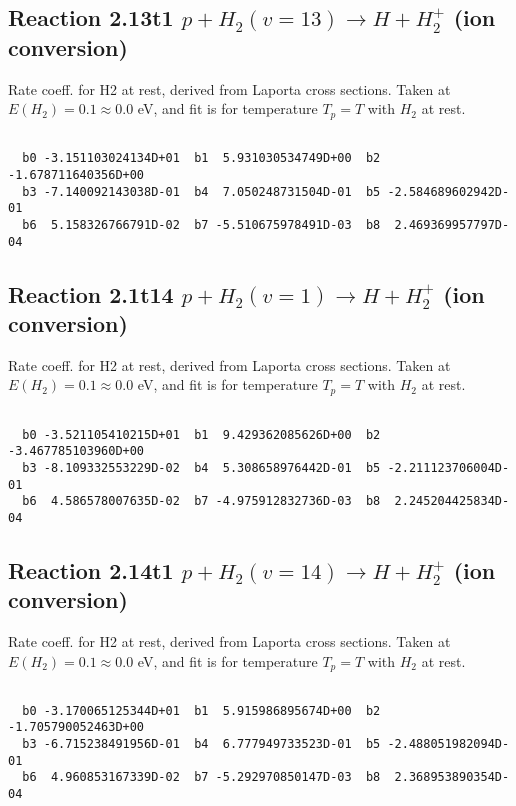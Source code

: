 \documentclass[12pt,dvipdfmx]{article}
\begin{document}
\newpage
\subsection{
Reaction 2.13t1
$ p + H_2(v=13) \rightarrow H + H_2^+$ (ion conversion)
}
Rate coeff. for H2 at rest, derived from Laporta cross sections.
Taken at $E(H_2) = 0.1 \approx 0.0$ eV,  and fit is for temperature $T_p=T$ with $H_2$ at rest.

\begin{small}\begin{verbatim}

  b0 -3.151103024134D+01  b1  5.931030534749D+00  b2 -1.678711640356D+00
  b3 -7.140092143038D-01  b4  7.050248731504D-01  b5 -2.584689602942D-01
  b6  5.158326766791D-02  b7 -5.510675978491D-03  b8  2.469369957797D-04

\end{verbatim}\end{small}

\newpage
\subsection{
Reaction 2.1t14
$ p + H_2(v=1) \rightarrow H + H_2^+$ (ion conversion)
}
Rate coeff. for H2 at rest, derived from Laporta cross sections.
Taken at $E(H_2) = 0.1 \approx 0.0$ eV,  and fit is for temperature $T_p=T$ with $H_2$ at rest.

\begin{small}\begin{verbatim}

  b0 -3.521105410215D+01  b1  9.429362085626D+00  b2 -3.467785103960D+00
  b3 -8.109332553229D-02  b4  5.308658976442D-01  b5 -2.211123706004D-01
  b6  4.586578007635D-02  b7 -4.975912832736D-03  b8  2.245204425834D-04

\end{verbatim}\end{small}

\newpage
\subsection{
Reaction 2.14t1
$ p + H_2(v=14) \rightarrow H + H_2^+$ (ion conversion)
}
Rate coeff. for H2 at rest, derived from Laporta cross sections.
Taken at $E(H_2) = 0.1 \approx 0.0$ eV,  and fit is for temperature $T_p=T$ with $H_2$ at rest.

\begin{small}\begin{verbatim}

  b0 -3.170065125344D+01  b1  5.915986895674D+00  b2 -1.705790052463D+00
  b3 -6.715238491956D-01  b4  6.777949733523D-01  b5 -2.488051982094D-01
  b6  4.960853167339D-02  b7 -5.292970850147D-03  b8  2.368953890354D-04

\end{verbatim}\end{small}
\end{document}
